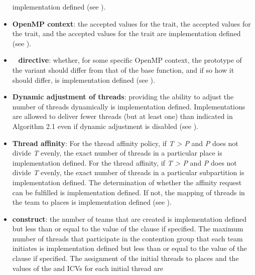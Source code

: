 \begin{itemize}
      implementation defined (see ).
\item \textbf{OpenMP context}: the accepted  values for
      the  trait, the accepted  values for the
       trait, and the accepted  values for
      the  trait are implementation defined (see
      ).
\item {}~ \textbf{directive}: whether, for some specific
      OpenMP context, the prototype of the variant should differ from that of
      the base function, and if so how it should differ, is implementation defined
      (see ).
\item \textbf{Dynamic adjustment of threads}: providing the ability to 
      adjust the number of threads dynamically is implementation defined. 
      Implementations are allowed to deliver fewer threads (but at least one) 
      than indicated in Algorithm 2.1 even if dynamic adjustment is disabled (see 
      ).
\item \textbf{Thread affinity}: For the  thread affinity policy, 
      if \emph{T > P} and \emph{P} does not divide \emph{T} evenly, the exact
      number of threads in a particular place is implementation defined.
      For the  thread affinity, if \emph{T > P} and \emph{P} does not
      divide \emph{T} evenly, the exact number of threads in a particular
      subpartition is implementation defined.  The determination of
      whether the affinity request can be fulfilled is implementation
      defined.  If not, the mapping of threads in the team 
      to places is implementation defined (see
      ).
\item {} \textbf{construct}: the number of teams that are created 
      is implementation defined but less than or equal to the value of the 
       clause if specified. The maximum number of threads 
      that participate in the contention group that each team initiates is
      implementation defined but less than or equal to the value of the 
       clause if specified.  The assignment of the 
      initial threads to places and the values of the  
      and  ICVs for each initial thread are

\end{itemize}
